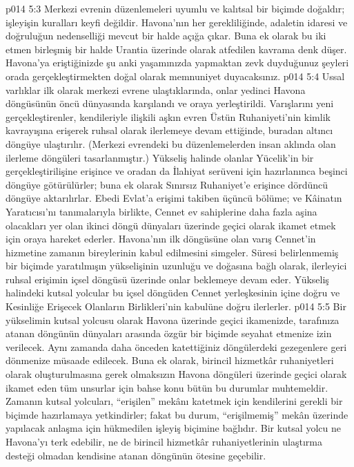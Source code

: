 \vs p014 5:3 Merkezi evrenin düzenlemeleri uyumlu ve kalıtsal bir biçimde doğaldır; işleyişin kuralları keyfi değildir. Havona’nın her gerekliliğinde, adaletin idaresi ve doğruluğun nedenselliği mevcut bir halde açığa çıkar. Buna ek olarak bu iki etmen birleşmiş bir halde Urantia üzerinde  olarak atfedilen kavrama denk düşer. Havona’ya eriştiğinizde şu anki yaşamınızda yapmaktan zevk duyduğunuz şeyleri orada gerçekleştirmekten doğal olarak memnuniyet duyacaksınız.
\vs p014 5:4 Ussal varlıklar ilk olarak merkezi evrene ulaştıklarında, onlar yedinci Havona döngüsünün öncü dünyasında karşılandı ve oraya yerleştirildi. Varışlarını yeni gerçekleştirenler, kendileriyle ilişkili aşkın evren Üstün Ruhaniyeti’nin kimlik kavrayışına erişerek ruhsal olarak ilerlemeye devam ettiğinde, buradan altıncı döngüye ulaştırılır. (Merkezi evrendeki bu düzenlemelerden insan aklında olan ilerleme döngüleri tasarlanmıştır.) Yükseliş halinde olanlar Yücelik’in bir gerçekleştirilişine erişince ve oradan da İlahiyat serüveni için hazırlanınca beşinci döngüye götürülürler; buna ek olarak Sınırsız Ruhaniyet’e erişince dördüncü döngüye aktarılırlar. Ebedi Evlat’a erişimi takiben üçüncü bölüme; ve Kâinatın Yaratıcısı’nı tanımalarıyla birlikte, Cennet ev sahiplerine daha fazla aşina olacakları yer olan ikinci döngü dünyaları üzerinde geçici olarak ikamet etmek için oraya hareket ederler. Havona’nın ilk döngüsüne olan varış Cennet’in hizmetine zamanın bireylerinin kabul edilmesini simgeler. Süresi belirlenmemiş bir biçimde yaratılmışın yükselişinin uzunluğu ve doğasına bağlı olarak, ilerleyici ruhsal erişimin içsel döngüsü üzerinde onlar beklemeye devam eder. Yükseliş halindeki kutsal yolcular bu içsel döngüden Cennet yerleşkesinin içine doğru ve Kesinliğe Erişecek Olanların Birlikleri’nin kabulüne doğru ilerlerler.
\vs p014 5:5 Bir yükselimin kutsal yolcusu olarak Havona üzerinde geçici ikamenizde, tarafınıza atanan döngünün dünyaları arasında özgür bir biçimde seyahat etmenize izin verilecek. Aynı zamanda daha önceden katettiğiniz döngülerdeki gezegenlere geri dönmenize müsaade edilecek. Buna ek olarak, birincil hizmetkâr ruhaniyetleri olarak oluşturulmasına gerek olmaksızın Havona döngüleri üzerinde geçici olarak ikamet eden tüm unsurlar için bahse konu bütün bu durumlar muhtemeldir. Zamanın kutsal yolcuları, “erişilen” mekânı katetmek için kendilerini gerekli bir biçimde hazırlamaya yetkindirler; fakat bu durum, “erişilmemiş” mekân üzerinde yapılacak anlaşma için hükmedilen işleyiş biçimine bağlıdır. Bir kutsal yolcu ne Havona’yı terk edebilir, ne de birincil hizmetkâr ruhaniyetlerinin ulaştırma desteği olmadan kendisine atanan döngünün ötesine geçebilir.

